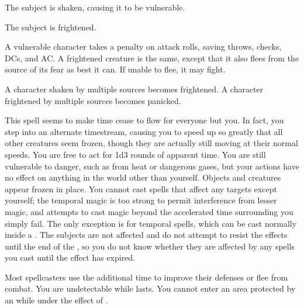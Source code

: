 \spellrng{\rngclose}
\spelldur{\durshort}
\begin{spellhealthy}
  The subject is shaken, causing it to be vulnerable.
\end{spellhealthy}
\begin{spellblood}
  The subject is frightened.
\end{spellblood}
\begin{spellnotes}
  A vulnerable character takes a  penalty on attack rolls, saving throws, checks, DCs, and AC. A frightened creature is the same, except that it also flees from the source of its fear as best it can. If unable to flee, it may fight.
  \par A character shaken by multiple sources becomes frightened. A character frightened by multiple sources becomes panicked.
\end{spellnotes}

\begin{spelleffect}
  This spell seems to make time cease to flow for everyone but you. In fact, you step into an alternate timestream, causing you to speed up so greatly that all other creatures seem frozen, though they are actually still moving at their normal speeds. You are free to act for 1d3 rounds of apparent time. You are still vulnerable to danger, such as from heat or dangerous gases, but your actions have no effect on anything in the world other than yourself. Objects and creatures appear frozen in place. You cannot cast spells that affect any targets except yourself; the temporal magic is too strong to permit interference from lesser magic, and attempts to cast magic beyond the accelerated time surrounding you simply fail. The only exception is for temporal spells, which can be cast normally inside a . The subjects are not affected and do not attempt to resist the effects until the end of the , so you do not know whether they are affected by any spells you cast until the effect has expired.
\end{spelleffect}
\begin{spellnotes}
  Most spellcasters use the additional time to improve their defenses or flee from combat. You are undetectable while  lasts. You cannot enter an area protected by an  while under the effect of .
\end{spellnotes}

